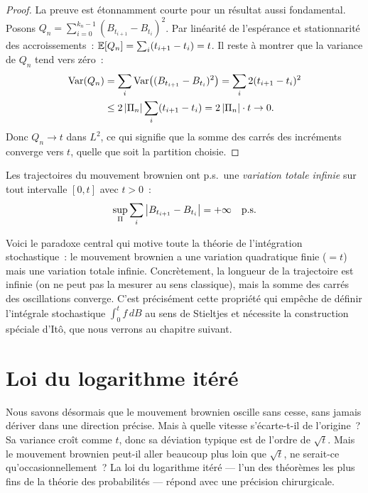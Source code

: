 \begin{proof}
La preuve est \'etonnamment courte pour un r\'esultat aussi fondamental. Posons
$Q_n = \sum_{i=0}^{k_n-1} (B_{t_{i+1}} - B_{t_i})^2$. Par lin\'earit\'e de
l'esp\'erance et stationnarit\'e des accroissements~:
$\mathbb{E}[Q_n] = \sum_i (t_{i+1} - t_i) = t$. Il reste \`a montrer que la variance
de $Q_n$ tend vers z\'ero~:
\begin{align*}
  \mathrm{Var}(Q_n) &= \sum_i \mathrm{Var}\bigl((B_{t_{i+1}} - B_{t_i})^2\bigr)
  = \sum_i 2(t_{i+1} - t_i)^2 \\
  &\leq 2 \left| \Pi_n \right| \sum_i (t_{i+1} - t_i) = 2 \left| \Pi_n \right| \cdot t \to 0.
\end{align*}
Donc $Q_n \to t$ dans $L^2$, ce qui signifie que la somme des carr\'es des
incr\'ements converge vers $t$, quelle que soit la partition choisie.
\end{proof}

\begin{theoreme}
\label{thm:var_totale}
Les trajectoires du mouvement brownien ont p.s.\ une \emph{variation totale infinie}
sur tout intervalle $[0, t]$ avec $t > 0$~:
\[
  \sup_{\Pi} \sum_i \left| B_{t_{i+1}} - B_{t_i} \right| = +\infty \quad \text{p.s.}
\]
\end{theoreme}

\begin{attention}[title=\textbf{Variation quadratique finie, variation totale infinie}]
Voici le paradoxe central qui motive toute la th\'eorie de l'int\'egration
stochastique~: le mouvement brownien a une variation quadratique finie
($= t$) mais une variation totale infinie. Concr\`etement, la \og longueur\fg{}
de la trajectoire est infinie (on ne peut pas la mesurer au sens classique),
mais la \og somme des carr\'es\fg{} des oscillations converge. C'est
pr\'ecis\'ement cette propri\'et\'e qui emp\^eche de d\'efinir l'int\'egrale
stochastique $\int_0^t f \, dB$ au sens de Stieltjes et n\'ecessite la
construction sp\'eciale d'It\^o, que nous verrons au chapitre suivant.
\end{attention}

\section{Loi du logarithme it\'er\'e}

Nous savons d\'esormais que le mouvement brownien oscille sans cesse, sans
jamais d\'eriver dans une direction pr\'ecise. Mais \`a quelle \og vitesse\fg{}
s'\'ecarte-t-il de l'origine~? Sa variance cro\^it comme $t$, donc sa
d\'eviation typique est de l'ordre de $\sqrt{t}$. Mais le mouvement brownien
peut-il aller beaucoup plus loin que $\sqrt{t}$, ne serait-ce
qu'occasionnellement~? La loi du logarithme it\'er\'e --- l'un des th\'eor\`emes
les plus fins de la th\'eorie des probabilit\'es --- r\'epond avec une
pr\'ecision chirurgicale.

